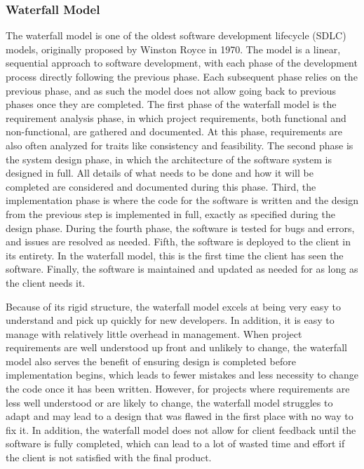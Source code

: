 \subsubsection{Waterfall Model}
The waterfall model is one of the oldest software development lifecycle (SDLC) models, originally proposed by Winston Royce in 1970. The model is a linear, sequential approach to software development, with each phase of the development process directly following the previous phase. Each subsequent phase relies on the previous phase, and as such the model does not allow going back to previous phases once they are completed. The first phase of the waterfall model is the requirement analysis phase, in which project requirements, both functional and non-functional, are gathered and documented. At this phase, requirements are also often analyzed for traits like consistency and feasibility. The second phase is the system design phase, in which the architecture of the software system is designed in full. All details of what needs to be done and how it will be completed are considered and documented during this phase. Third, the implementation phase is where the code for the software is written and the design from the previous step is implemented in full, exactly as specified during the design phase. During the fourth phase, the software is tested for bugs and errors, and issues are resolved as needed. Fifth, the software is deployed to the client in its entirety. In the waterfall model, this is the first time the client has seen the software. Finally, the software is maintained and updated as needed for as long as the client needs it.

Because of its rigid structure, the waterfall model excels at being very easy to understand and pick up quickly for new developers. In addition, it is easy to manage with relatively little overhead in management. When project requirements are well understood up front and unlikely to change, the waterfall model also serves the benefit of ensuring design is completed before implementation begins, which leads to fewer mistakes and less necessity to change the code once it has been written. However, for projects where requirements are less well understood or are likely to change, the waterfall model struggles to adapt and may lead to a design that was flawed in the first place with no way to fix it. In addition, the waterfall model does not allow for client feedback until the software is fully completed, which can lead to a lot of wasted time and effort if the client is not satisfied with the final product. 

